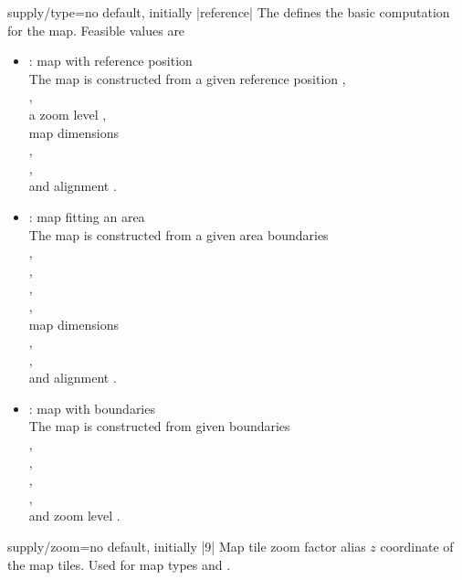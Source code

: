 \begin{docMrcKey}{supply/type}{=}{no default, initially |reference|}
  The  defines the basic computation for the map. Feasible values are
  \begin{itemize}
  \item{}: \flqq map with reference position\frqq\\
    The map is constructed from a given reference position
    ,\\
    ,\\
    a zoom level ,\\
    map dimensions\\
    ,\\
    ,\\
    and alignment .
  \item{}: \flqq map fitting an area\frqq\\
    The map is constructed from a given area boundaries\\
    ,\\
    ,\\
    ,\\
    ,\\
    map dimensions\\
    ,\\
    ,\\
    and alignment .
  \item{}: \flqq map with boundaries\frqq\\
    The map is constructed from given boundaries\\
    ,\\
    ,\\
    ,\\
    ,\\
    and zoom level .
  \end{itemize}
\end{docMrcKey}

\begin{docMrcKey}{supply/zoom}{=}{no default, initially |9|}
  Map tile zoom factor alias $z$ coordinate of the map tiles.
  Used for map types  and .
\end{docMrcKey}

